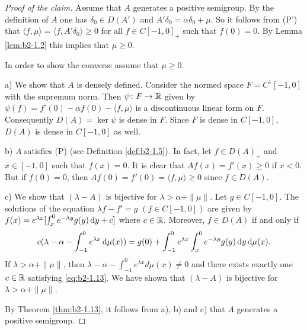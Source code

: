 \begin{proof}[Proof of the claim]
Assume that $A$ generates a positive semigroup.
By the definition of $A$ one has $\delta_{0} \in D(A')$ and $A'\delta_{0} = \alpha\delta_{0} + \mu$.
So it follows from (P') that $\langle f,\mu \rangle = \langle f,A'\delta_{0} \rangle \geq 0$ for all $f \in C[-1,0]_{+}$ such that $f(0) = 0$.
By Lemma \ref{lem:b2-1.2}
this implies that $\mu \geq 0$.

In order to show the converse assume that $\mu \geq 0$.

a) We show that $A$ is densely defined.
Consider the normed space $F = C^{1}[-1,0]$ with the supremum norm.
Then $\psi \colon F \to \mathbb{R}$ given by 
$\psi(f) = f'(0) - \alpha f(0) - \langle f,\mu \rangle$ 
is a discontinuous linear form on $F$.
Consequently $D(A) = \ker \psi$ is dense in $F$.
Since $F$ is dense in $C[-1,0]$, $D(A)$ is dense in $C[-1,0]$ as well.

b) $A$ satisfies (P) (see Definition \ref{def:b2-1.5}).
In fact, let $f \in D(A)_{+}$ and $x \in [-1,0]$ such that $f(x) = 0$.
It is clear that $Af(x) = f'(x) \geq 0$ if $x < 0$.
But if $f(0) = 0$, then $Af(0) = f'(0) = \langle f,\mu \rangle \geq 0$ since $f \in D(A)$.

c) We show that $(\lambda-A)$ is bijective for $\lambda > \alpha + \|\mu\|$.
Let $g \in C[-1,0]$.
The solutions of the equation $\lambda f - f' = g$ $(f \in C[-1,0])$ are given by $f(x) = e^{\lambda x}[\int_{x}^{0} e^{-\lambda y} g(y) \mathop{}\!\mathrm{d}{y} + c]$ where $c \in \mathbb{R}$.
Moreover, $f \in D(A)$ if and only if
\begin{equation}\label{eq:b2-1.13}
c(\lambda - \alpha - \int_{-1}^{0} e^{\lambda x} \mathop{}\!\mathrm{d}{\mu(x)}) = g(0) + \int_{-1}^{0} e^{\lambda x} \int_{x}^{0}e^{-\lambda y} g(y) \mathop{}\!\mathrm{d}{y}\mathop{}\!\mathrm{d}{\mu(x)}.
\end{equation}
If $\lambda > \alpha + \|\mu\|$, then $\lambda - \alpha - \int_{-1}^{0} e^{\lambda x} d\mu(x) \neq 0$ and there exists exactly one $c \in \mathbb{R}$ satisfying \eqref{eq:b2-1.13}.
We have shown that $(\lambda- A)$ is bijective for $\lambda > \alpha + \|\mu\|$.

By Theorem \ref{thm:b2-1.13}, it follows from a), b) and c) that $A$ generates a positive semigroup.
\end{proof}

